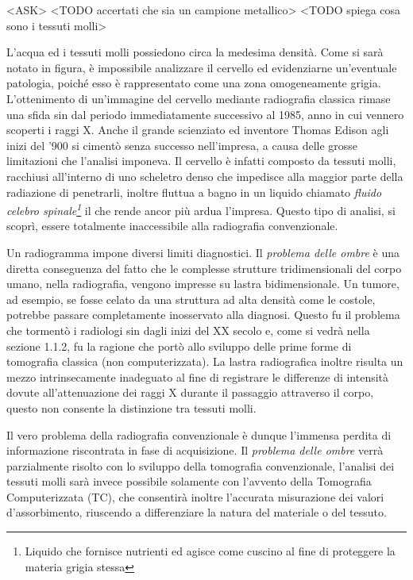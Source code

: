 \documentclass[a4paper,12pt, doubleside]{report}
\begin{document}
                    
                        <ASK> <TODO accertati che sia un campione metallico>
                        <TODO spiega cosa sono i tessuti molli>
                   
                            
                \par 
                    L’acqua ed i tessuti molli possiedono circa la medesima densità. Come si sarà notato in figura, è impossibile analizzare il cervello ed evidenziarne un'eventuale patologia, poiché esso è rappresentato come una zona omogeneamente grigia. L'ottenimento di un'immagine del cervello mediante radiografia classica rimase una sfida sin dal periodo immediatamente successivo al 1985, anno in cui vennero scoperti i raggi X. Anche il grande scienziato ed inventore Thomas Edison agli inizi del '900 si cimentò senza successo nell'impresa, a causa delle grosse limitazioni che l'analisi imponeva.\cite{thomas-edison-brain} Il cervello è infatti composto da tessuti molli, racchiusi all’interno di uno scheletro denso che impedisce alla maggior parte della radiazione di penetrarli, inoltre fluttua a bagno in un liquido chiamato \textit{fluido celebro spinale\footnote{Liquido che fornisce nutrienti ed agisce come cuscino al fine di proteggere la materia grigia stessa}} il che rende ancor più ardua l'impresa. Questo tipo di analisi, si scoprì, essere totalmente inaccessibile alla radiografia convenzionale.
                            
                \par
                    Un radiogramma impone diversi limiti diagnostici. Il \textit{problema delle ombre} è una diretta conseguenza del fatto che le complesse strutture tridimensionali del corpo umano, nella radiografia, vengono impresse su lastra bidimensionale. Un tumore, ad esempio, se fosse celato da una struttura ad alta densità come le costole, potrebbe passare completamente inosservato alla diagnosi. Questo fu il problema che tormentò i radiologi sin dagli inizi del XX secolo e, come si vedrà nella sezione 1.1.2, fu la ragione che portò allo sviluppo delle prime forme di tomografia classica (non computerizzata).
                    La lastra radiografica inoltre risulta un mezzo intrinsecamente inadeguato al fine di registrare le differenze di intensità dovute all'attenuazione dei raggi X durante il passaggio attraverso il corpo, questo non consente la distinzione tra tessuti molli.
                            
                \par
                    Il vero problema della radiografia convenzionale è dunque l'immensa perdita di informazione riscontrata in fase di acquisizione. Il \textit{problema delle ombre} verrà parzialmente risolto con lo sviluppo della tomografia convenzionale, l'analisi dei tessuti molli sarà invece possibile solamente con l'avvento della Tomografia Computerizzata (TC), che consentirà inoltre l'accurata misurazione dei valori d'assorbimento, riuscendo a differenziare la natura del materiale o del tessuto.
                            
\end{document}
